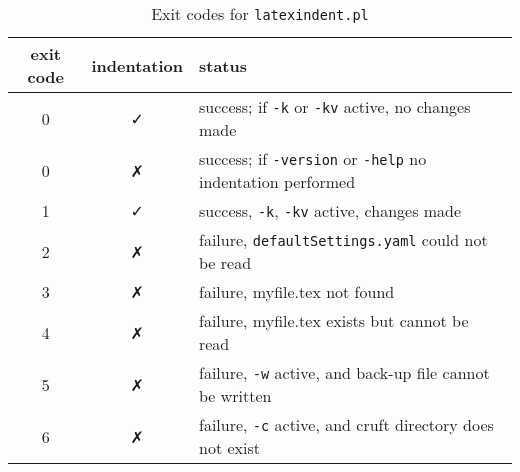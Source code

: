 	\begin{table}[!htb]
		\caption{Exit codes for \texttt{latexindent.pl}}
		\label{tab:exit-codes}
		\begin{tabular}{ccl}
			\toprule
			exit code & indentation & status                                                                   \\
			\midrule
			0         & \faCheck    & success; if \texttt{-k} or \texttt{-kv} active, no changes made          \\
			0         & \faClose    & success; if \texttt{-version} or \texttt{-help} no indentation performed \\
			1         & \faCheck    & success, \texttt{-k}, \texttt{-kv} active, changes made                  \\
			\midrule
			2         & \faClose    & failure, \texttt{defaultSettings.yaml} could not be read                 \\
			3         & \faClose    & failure, myfile.tex not found                                            \\
			4         & \faClose    & failure, myfile.tex exists but cannot be read                            \\
			5         & \faClose    & failure, \texttt{-w} active, and back-up file cannot be written          \\
			6         & \faClose    & failure, \texttt{-c} active, and cruft directory does not exist          \\
			\bottomrule
		\end{tabular}
	\end{table}
